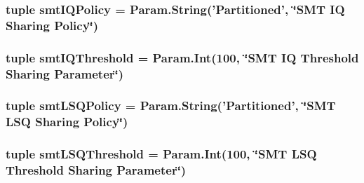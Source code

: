 \label{classO3CPU_1_1DerivO3CPU_a349052a4ccb84410a8e2ae982cdf1bbc}
\hypertarget{classO3CPU_1_1DerivO3CPU_a09ad04b0a2fee606eff57ec604445dbb}{
\subsubsection[{smtIQPolicy}]{\setlength{\rightskip}{0pt plus 5cm}tuple {\bf smtIQPolicy} = Param.String('Partitioned', \char`\"{}SMT IQ Sharing Policy\char`\"{})}}
\label{classO3CPU_1_1DerivO3CPU_a09ad04b0a2fee606eff57ec604445dbb}
\hypertarget{classO3CPU_1_1DerivO3CPU_ab239c1e3b71d524ffdc9147b9bb85383}{
\subsubsection[{smtIQThreshold}]{\setlength{\rightskip}{0pt plus 5cm}tuple {\bf smtIQThreshold} = Param.Int(100, \char`\"{}SMT IQ Threshold Sharing Parameter\char`\"{})}}
\label{classO3CPU_1_1DerivO3CPU_ab239c1e3b71d524ffdc9147b9bb85383}
\hypertarget{classO3CPU_1_1DerivO3CPU_aa002a74d5cf338da61e3e35bfcc19fa0}{
\subsubsection[{smtLSQPolicy}]{\setlength{\rightskip}{0pt plus 5cm}tuple {\bf smtLSQPolicy} = Param.String('Partitioned', \char`\"{}SMT {\bf LSQ} Sharing Policy\char`\"{})}}
\label{classO3CPU_1_1DerivO3CPU_aa002a74d5cf338da61e3e35bfcc19fa0}
\hypertarget{classO3CPU_1_1DerivO3CPU_a7f52774912af5111096695b4fe368e00}{
\subsubsection[{smtLSQThreshold}]{\setlength{\rightskip}{0pt plus 5cm}tuple {\bf smtLSQThreshold} = Param.Int(100, \char`\"{}SMT {\bf LSQ} Threshold Sharing Parameter\char`\"{})}}

